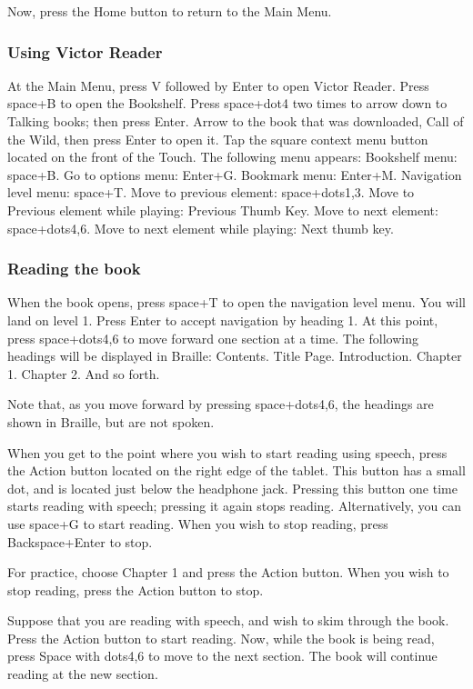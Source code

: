 \documentclass[10pt,letterpaper,twoside]{report}
\begin{document}
{{{Now, press the Home button to return to the Main Menu.

\subsubsection{Using Victor Reader}

At the Main Menu, press V followed by Enter to open Victor Reader.
Press space+B to open the Bookshelf.
Press space+dot4 two times to arrow down to Talking books; then press Enter.
Arrow to the book that was downloaded, Call of the Wild, then press Enter to open it.
Tap the square context menu button located on the front of the Touch.
The following menu appears:
Bookshelf menu: space+B.
Go to options menu: Enter+G.
Bookmark menu: Enter+M.
Navigation level menu: space+T.
Move to previous element: space+dots1,3.
Move to Previous element while playing: Previous Thumb Key.
Move to next element: space+dots4,6.
Move to next element while playing: Next thumb key.

\subsubsection{Reading the book}

When the book opens, press space+T to open the navigation level menu. You will land on level 1. Press Enter to accept navigation by heading 1.
At this point, press space+dots4,6 to move forward one section at a time.
The following headings will be displayed in Braille:
Contents.
Title Page.
Introduction.
Chapter 1.
Chapter 2.
And so forth.

Note that, as you move forward by pressing space+dots4,6, the headings are shown in Braille, but are not spoken.

When you get to the point where you wish to start reading using speech, press the Action button located on the right edge of the tablet. This button has a small dot, and is located just below the headphone jack. Pressing this button one time starts reading with speech; pressing it again stops reading. Alternatively, you can use space+G to start reading. When you wish to stop reading, press Backspace+Enter to stop.

For practice, choose Chapter 1 and press the Action button. When you wish to stop reading, press the Action button to stop.

Suppose that you are reading with speech, and wish to skim through the book.
Press the Action button to start reading.
Now, while the book is being read, press Space with dots4,6 to move to the next section. The book will continue reading at the new section.

}}}
\end{document}
